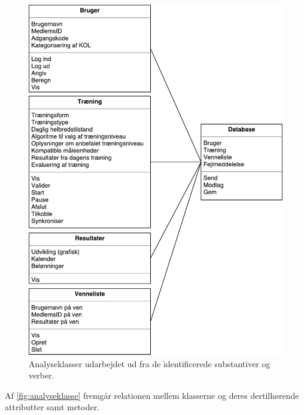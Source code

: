 \begin{figure}[H]
\centering
\includegraphics[width=1\textwidth]{figures/aktivitetsdiagram/analyseklasser}
\caption{Analyseklasser udarbejdet ud fra de identificerede substantiver og verber.}
\label{fig:analyseklasse}
\end{figure}

\noindent
Af \autoref{fig:analyseklasse} fremgår relationen mellem klasserne og deres dertilhørende attributter samt metoder. 

